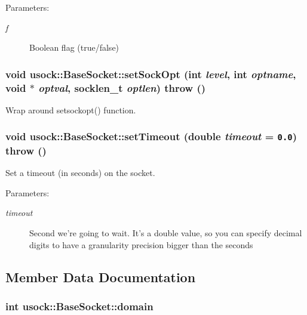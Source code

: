 \begin{Desc}
\item[Parameters:]
\begin{description}
\item[{\em f}]Boolean flag (true/false) \end{description}
\end{Desc}
\hypertarget{classusock_1_1BaseSocket_d0444de98899e9312bfa320d5a359e07}{
\subsubsection[{setSockOpt}]{\setlength{\rightskip}{0pt plus 5cm}void usock::BaseSocket::setSockOpt (int {\em level}, \/  int {\em optname}, \/  void $\ast$ {\em optval}, \/  socklen\_\-t {\em optlen})  throw ()}}
\label{classusock_1_1BaseSocket_d0444de98899e9312bfa320d5a359e07}


Wrap around setsockopt() function. 

\hypertarget{classusock_1_1BaseSocket_e31552b42df68bc68fe557caf6e75128}{
\subsubsection[{setTimeout}]{\setlength{\rightskip}{0pt plus 5cm}void usock::BaseSocket::setTimeout (double {\em timeout} = {\tt 0.0})  throw ()}}
\label{classusock_1_1BaseSocket_e31552b42df68bc68fe557caf6e75128}


Set a timeout (in seconds) on the socket. 

\begin{Desc}
\item[Parameters:]
\begin{description}
\item[{\em timeout}]Second we're going to wait. It's a double value, so you can specify decimal digits to have a granularity precision bigger than the seconds \end{description}
\end{Desc}


\subsection{Member Data Documentation}
\hypertarget{classusock_1_1BaseSocket_9a7414d934aeccd1340292214a2aef0e}{
\subsubsection[{domain}]{\setlength{\rightskip}{0pt plus 5cm}int {\bf usock::BaseSocket::domain}}}
\label{classusock_1_1BaseSocket_9a7414d934aeccd1340292214a2aef0e}


